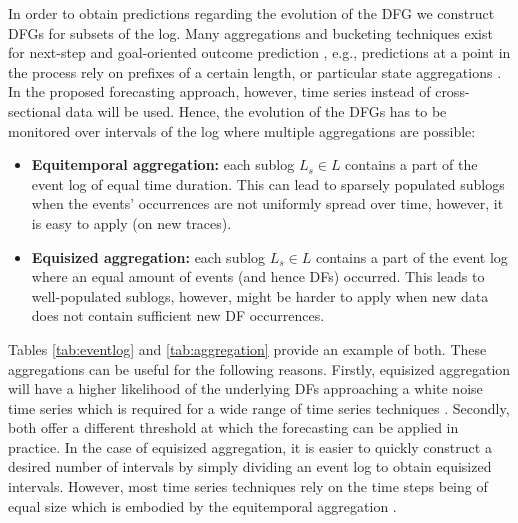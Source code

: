 In order to obtain predictions regarding the evolution of the DFG we construct DFGs for subsets of the log.
Many aggregations and bucketing techniques exist for next-step and goal-oriented outcome prediction \cite{DBLP:conf/caise/TaxVRD17,DBLP:journals/tkdd/TeinemaaDRM19}, e.g., predictions at a point in the process rely on prefixes of a certain length, or particular state aggregations \cite{DBLP:journals/sosym/AalstRVDKG10}.
In the proposed forecasting approach, however, time series instead of cross-sectional data will be used.
Hence, the evolution of the DFGs has to be monitored over intervals of the log where multiple aggregations are possible:
\begin{itemize}
	\item \textbf{Equitemporal aggregation:} each sublog $L_s\in L$ contains a part of the event log of equal time duration. This can lead to sparsely populated sublogs when the events' occurrences are not uniformly spread over time, however, it is easy to apply (on new traces).
	\item \textbf{Equisized aggregation:} each sublog $L_s\in L$ contains a part of the event log where an equal amount of events (and hence DFs) occurred. This leads to well-populated sublogs, however, might be harder to apply when new data does not contain sufficient new DF occurrences.
\end{itemize}
Tables \ref{tab:eventlog} and \ref{tab:aggregation} provide an example of both.
These aggregations can be useful for the following reasons.
Firstly, equisized aggregation will have a higher likelihood of the underlying DFs approaching a white noise time series which is required for a wide range of time series techniques \cite{hyndman2018forecasting}. 
Secondly, both offer a different threshold at which the forecasting can be applied in practice.
In the case of equisized aggregation, it is easier to quickly construct a desired number of intervals by simply dividing an event log to obtain equisized intervals.
However, most time series techniques rely on the time steps being of equal size which is embodied by the equitemporal aggregation \cite{kil1997optimum}.
